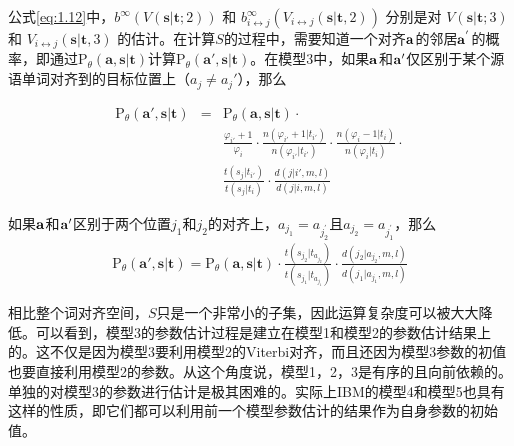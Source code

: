 \begin{appendices}
\vspace{0.5em}
\parinterval 公式\ref{eq:1.12}中，$b^{\infty}(V(\mathbf{s}|\mathbf{t};2))$ 和 $b_{i \leftrightarrow j}^{\infty}(V_{i \leftrightarrow j}(\mathbf{s}|\mathbf{t},2))$ 分别是对 $V(\mathbf{s}|\mathbf{t};3)$ 和 $V_{i \leftrightarrow j}(\mathbf{s}|\mathbf{t},3)$ 的估计。在计算$S$的过程中，需要知道一个对齐$\bf{a}$的邻居$\bf{a}^{'}$的概率，即通过$\textrm{P}_{\theta}(\mathbf{a},\mathbf{s}|\mathbf{t})$计算$\textrm{P}_{\theta}(\mathbf{a}',\mathbf{s}|\mathbf{t})$。在模型3中，如果$\bf{a}$和$\bf{a}'$仅区别于某个源语单词对齐到的目标位置上（$a_j \neq a_{j}'$），那么

\begin{eqnarray}
\textrm{P}_{\theta}(\mathbf{a}',\mathbf{s}|\mathbf{t}) & = & \textrm{P}_{\theta}(\mathbf{a},\mathbf{s}|\mathbf{t}) \cdot  \nonumber \\
                                                                                   &     & \frac{\varphi_{i'}+1}{\varphi_i} \cdot \frac{n(\varphi_{i'}+1|t_{i'})}{n(\varphi_{i'}|t_{i'})} \cdot \frac{n(\varphi_{i}-1|t_{i})}{n(\varphi_{i}|t_{i})} \cdot \nonumber \\
                                                                                   &     & \frac{t(s_j|t_{i'})}{t(s_{j}|t_{i})} \cdot \frac{d(j|i',m,l)}{d(j|i,m,l)}
\label{eq:1.13}
\end{eqnarray}

\parinterval 如果$\bf{a}$和$\bf{a}'$区别于两个位置$j_1$和$j_2$的对齐上，$a_{j_{1}}=a_{j_{2}^{'}}$且$a_{j_{2}}=a_{j_{1}^{'}}$，那么
\begin{eqnarray}
\textrm{P}_{\theta}(\mathbf{a'},\mathbf{s}|\mathbf{t}) = \textrm{P}_{\theta}(\mathbf{a},\mathbf{s}|\mathbf{t}) \cdot \frac{t(s_{j_{2}}|t_{a_{j_{2}}})}{t(s_{j_{1}}|t_{a_{j_{1}}})} \cdot \frac{d(j_{2}|a_{j_{2}},m,l)}{d(j_{1}|a_{j_{1}},m,l)}
\label{eq:1.14}
\end{eqnarray}

\parinterval 相比整个词对齐空间，$S$只是一个非常小的子集，因此运算复杂度可以被大大降低。可以看到，模型3的参数估计过程是建立在模型1和模型2的参数估计结果上的。这不仅是因为模型3要利用模型2的Viterbi对齐，而且还因为模型3参数的初值也要直接利用模型2的参数。从这个角度说，模型1，2，3是有序的且向前依赖的。单独的对模型3的参数进行估计是极其困难的。实际上IBM的模型4和模型5也具有这样的性质，即它们都可以利用前一个模型参数估计的结果作为自身参数的初始值。



\end{appendices}

